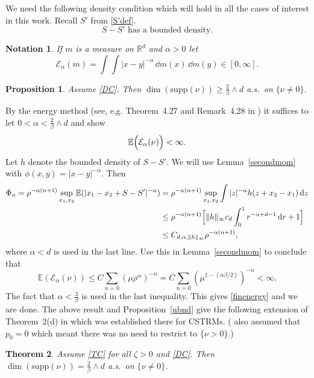 \documentclass[12pt]{article}
\makeatletter
\renewenvironment{proof}[1][\proofname]{%
\par\pushQED{\qed}\normalfont%
\topsep6\p@\@plus6\p@\relax
\trivlist\item[\hskip\labelsep\bfseries#1\@addpunct{.}]%
\ignorespaces
}{%
\popQED\endtrivlist\@endpefalse
}
\newtheorem{theorem}{Theorem}
\newtheorem{proposition}[theorem]{Proposition}
\numberwithin{theorem}{section}
\theoremstyle{def}
\newtheorem*{notation}{Notation}
\numberwithin{equation}{section}
\newcommand{\E}{\mathbb{E}}
\newcommand{\R}{\mathbb{R}}
\newcommand{\cE}{\mathcal E}
\newcommand{\supp}{\mathrm{supp}}
\makeatother
\begin{document}
We need the following density condition which will hold in all the cases of interest in this work. 
Recall $S'$ from \eqref{S'def}.
\begin{equation*}\tag{DC}\label{DC}
	S-S' \text{ has a bounded density.}
\end{equation*}
\begin{notation} If $m$ is a measure on $\R^d$ and $\alpha>0$ let 
\[\cE_\alpha(m)=\int\int|x-y|^{-\alpha}\,\dd m(x)\,\dd m(y)\in[0,\infty].\]
\end{notation}
\begin{proposition}\label{lbnd}
Assume \eqref{DC}.  Then $\dim(\supp(\nu))\ge \frac{2}{\beta}\wedge d$ a.s.\ on $\{\nu\neq 0\}$. 
\end{proposition}
\begin{proof} By the energy method (see, e.g. Theorem~4.27 and Remark~4.28 in \cite{MP}) it suffices to let $0<\alpha<\frac{2}{\beta}\wedge d$ and show
\begin{equation}\label{finenergy}
\E\Bigl(\cE_\alpha(\nu)\Bigr)<\infty.
\end{equation}
Let $h$ denote the bounded density of $S-S'$. We will use Lemma~\ref{secondmom} with $\phi(x,y)=|x-y|^{-\alpha}$. 
Then 
\begin{align*}
\Phi_n=\rho^{-\alpha(n+1)}\sup_{x_1,x_2} \E(|x_1-x_2+S-S'|^{-\alpha})&=\rho^{-\alpha(n+1)}\sup_{x_1,x_2}\int|z|^{-\alpha}h(z+x_2-x_1)\,\dd z\\
&\le \rho^{-\alpha(n+1)}\Bigl[\Vert h\Vert_\infty c_d\int_0^1r^{-\alpha+d-1}\,\dd r +1\Bigr]\\
&\le C_{d,\alpha,\Vert h\Vert_\infty} \rho^{-\alpha(n+1)},
\end{align*}
where $\alpha<d$ is used in the last line. Use this in Lemma~\ref{secondmom} to conclude that
\[ \E(\cE_\alpha(\nu))\le C\sum_{n=0}(\mu\rho^{\alpha})^{-n}=C\sum_{n=0}(\mu^{1-(\alpha\beta/2)})^{-n}<\infty.\]
The fact that $\alpha<\frac{2}{\beta}$ is used in the last inequality. This gives \eqref{finenergy} and we are done. 
\end{proof}
The above result and Proposition~\ref{ubnd} give the following extension of Theorem~2(d) in \cite{ADHP} which was established there for CSTRMs. (\cite{ADHP} also assumed that $p_0=0$ which meant there was no need to restrict to $\{\nu>0\}$.) 
\begin{theorem}\label{Hdim}
Assume \ref{TC} for all ${\zeta}>0$ and \eqref{DC}.  Then $\dim (\supp(\nu))=\frac{2}{\beta}\wedge d$ a.s.\ on $\{\nu\neq 0\}$.
\end{theorem}
\end{document}
